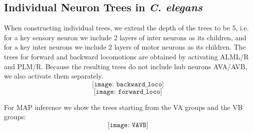 \documentclass[letterpaper,11pt]{article}
\newcommand\tab[1][6mm]{\hspace*{#1}}
\begin{document}
\subsection{Individual Neuron Trees in \textit{C. elegans}}
\tab When constructing individual trees, we extend the depth of the trees to be 5, i.e. for a key sensory neuron we include 2 layers of inter neurons as its children, and for a key inter neurons we include 2 layers of motor neurons as its children. The trees for forward and backward locomotions are obtained by activating ALML/R and PLM/R. Because the resulting trees do not include hub neurons AVA/AVB, we also activate them separately.
\[\texttt{[image: backward\_loco]}\]
\[\texttt{[image: forward\_loco]}\]

For MAP inference we show the trees starting from the VA groups and the VB groups:
\[\texttt{[image: VAVB]}\]
\newpage
\end{document}
